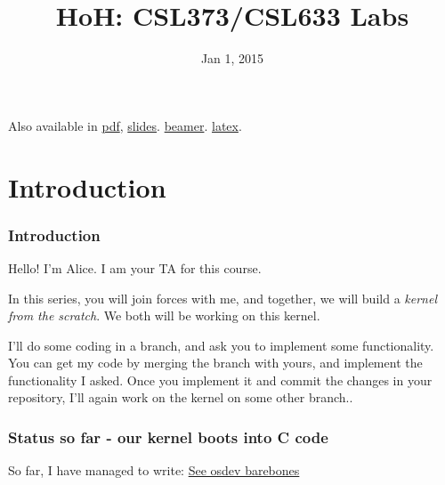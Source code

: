 \documentclass[]{book}
\title{HoH: CSL373/CSL633 Labs\\\vspace{0.5em}{\large \emph{What's the best way for learning OS? Create one!}}}
\date{Jan 1, 2015}
\begin{document}
\maketitle

Also available in \href{index.pdf}{pdf},
\href{index.slides.html}{slides}. \href{index.beamer.pdf}{beamer}.
\href{index.tex}{latex}.

\section*{Introduction}\label{introduction}

\subsubsection*{Introduction}\label{introduction-1}

Hello! I'm Alice. I am your TA for this course.

In this series, you will join forces with me, and together, we will
build a \emph{kernel from the scratch}. We both will be working on this
kernel.

I'll do some coding in a branch, and ask you to implement some
functionality. You can get my code by merging the branch with yours, and
implement the functionality I asked. Once you implement it and commit
the changes in your repository, I'll again work on the kernel on some
other branch..

\subsubsection*{Status so far - our kernel boots into C
code}\label{status-so-far---our-kernel-boots-into-c-code}

So far, I have managed to write:
\href{http://wiki.osdev.org/Bare_bones}{See osdev barebones}
\end{document}
